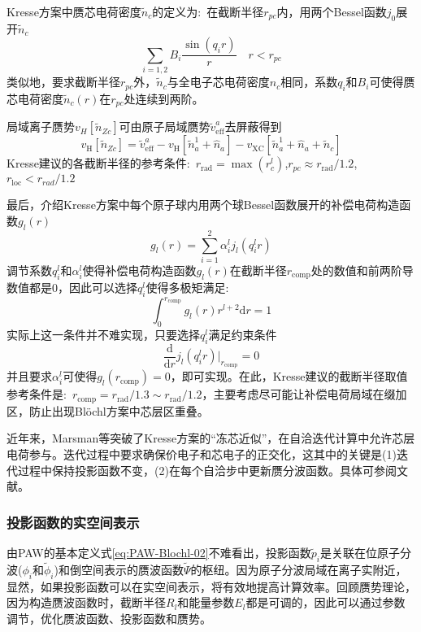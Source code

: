 \documentclass{article}      %
\begin{document}
\textrm{Kresse}方案中赝芯电荷密度$\tilde n_c$的定义为:~在截断半径$r_{pc}$内，用两个\textrm{Bessel}函数$j_0$展开$\tilde n_c$
$$\sum_{i=1,2}B_i\dfrac{\sin(q_ir)}r\quad r<r_{pc}$$
类似地，要求截断半径$r_{pc}$外，$\tilde n_c$与全电子芯电荷密度$n_c$相同，系数$q_i$和$B_i$可使得赝芯电荷密度$\tilde n_c(r)$在$r_{pc}$处连续到两阶。

局域离子赝势$v_H[\tilde n_{Zc}]$可由原子局域赝势$\tilde v_{\mathrm{eff}}^a$去屏蔽得到
$$v_{\mathrm H}[\tilde n_{Zc}]=\tilde v_{\mathrm{eff}}^a-v_{\mathrm H}[\tilde n_a^1+\hat n_a]-v_{\mathrm{XC}}[\tilde n_a^1+\hat n_a+\tilde n_c]$$
\textrm{Kresse}建议的各截断半径的参考条件:~$r_{\mathrm{rad}}=\max({r_c^l})$,$r_{pc}\approx r_{\mathrm{rad}}/1.2$,$r_{\mathrm{loc}}<r_{rad}/1.2$

最后，介绍\textrm{Kresse}方案中每个原子球内用两个球\textrm{Bessel}函数展开的补偿电荷构造函数$g_l(r)$
$$g_l(r)=\sum_{i=1}^2\alpha_i^lj_l(q_i^lr)$$
调节系数$q_i^l$和$\alpha_i^l$使得补偿电荷构造函数$g_l(r)$在截断半径$r_{\mathrm{comp}}$处的数值和前两阶导数值都是0，因此可以选择$q_i^l$使得多极矩满足:~
$$\int_0^{r_{\mathrm{comp}}}g_l(r)r^{l+2}\mathrm{d}r=1$$
实际上这一条件并不难实现，只要选择$q_i^l$满足约束条件
$$\dfrac{\mathrm{d}}{\mathrm{d}r}j_l(q_i^lr)\bigg|_{r_{\mathrm{comp}}}=0$$
并且要求$\alpha_i^l$可使得$g_l(r_{\mathrm{comp}})=0$，即可实现。在此，\textrm{Kresse}建议的截断半径取值参考条件是:~$r_{\mathrm{comp}}=r_{\mathrm{rad}}/1.3\sim r_{\mathrm{rad}}/1.2$，主要考虑尽可能让补偿电荷局域在缀加区，防止出现\textrm{Bl\"ochl}方案中芯层区重叠。

近年来，\textrm{Marsman}等突破了\textrm{Kresse}方案的“冻芯近似”，在自洽迭代计算中允许芯层电荷参与。迭代过程中要求确保价电子和芯电子的正交化，这其中的关键是(1)迭代过程中保持投影函数不变，(2)在每个自洽步中更新赝分波函数。具体可参阅文献\cite{JCP125-104101_2006}。

\subsubsection{投影函数的实空间表示}
由\textrm{PAW}的基本定义式\eqref{eq:PAW-Blochl-02}不难看出，投影函数$\tilde p_i$是关联在位原子分波($\phi_i$和$\tilde\phi_i$)和倒空间表示的赝波函数$\tilde\Psi$的枢纽。因为原子分波局域在离子实附近，显然，如果投影函数可以在实空间表示，将有效地提高计算效率。回顾赝势理论，因为构造赝波函数时，截断半径$R_l$和能量参数$E_l$都是可调的，因此可以通过参数调节，优化赝波函数、投影函数和赝势。
\end{document}
